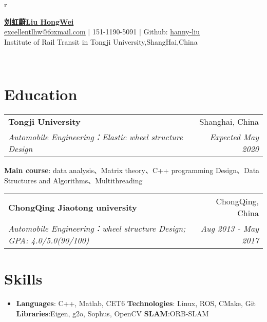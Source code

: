 \documentclass[CJK]{article}
\makeatletter
\newcommand{\resumeItemNoBullet}[2]{
  \item[]\small{
    \hspace{-9pt}\textbf{#1}{: #2 \vspace{-6pt}}%
  }
}
\newcommand{\resumeSubheading}[4]{
  \vspace{0pt}\item[]%
  \begin{tabular*}{0.98\textwidth}{l@{\extracolsep{\fill}}r}
      \hspace{-10pt}\textbf{#1} & #2 \\
      \hspace{-10pt}\textit{\small#3} & \textit{\small #4} \\
    \end{tabular*}\vspace{-5pt}
}
\newcommand{\resumeSubHeadingListStart}{\begin{itemize}[leftmargin=*]}
\newcommand{\resumeSubHeadingListEnd}{\end{itemize}}
\newcommand{\shorterSection}[1]{\vspace{-10pt}\section{#1}}
\makeatother
\begin{document}
\begin{CJK}{UTF8}{gkai}

\begin{multicols}{2}
    \Large{
        \begin{tabu}{ r }
        \end{tabu}
    }
    
\end{multicols}


\begin{center}

  \small \textbf{\textbf{\href{aptsunny.github.io}{\Large 刘虹蔚Liu HongWei}}} \\  \href{excellentlhw@foxmail.com}{\color{blue}\underline{excellentlhw@foxmail.com}} $\vert$
  151-1190-5091 $\vert$
  Github: \href{https://github.com/hanny-liu}{\color{blue}\underline{hanny-liu}} \\
  \small Institute of Rail Transit in Tongji University,ShangHai,China\\
\end{center}


~\\

\shorterSection{Education}
  \resumeSubHeadingListStart
    \resumeSubheading
      {\large Tongji University}{Shanghai, China}
      {Automobile Engineering：Elastic wheel structure Design}{Expected May 2020}{
      \resumeItemNoBullet{Main course}{data analysis、Matrix theory、C++ programming Design、Data Structures and Algorithms、Multithreading}}
      \vspace{2pt}
    \resumeSubheading
      {\large ChongQing Jiaotong university}{ChongQing, China}
      {Automobile Engineering：wheel structure Design;  GPA: 4.0/5.0(90/100)}{Aug 2013 - May 2017}
  \resumeSubHeadingListEnd

\shorterSection{Skills}
  \resumeSubHeadingListStart
  \small
    \item{
     \textbf{Languages}{: C++, Matlab, CET6\quad}
     \textbf{Technologies}{: Linux, ROS, CMake, Git\quad}
     \textbf{Libraries}{:Eigen, g2o, Sophus, OpenCV\quad}
     \textbf{SLAM}{:ORB-SLAM}
    }
\resumeSubHeadingListEnd


\end{CJK}
\end{document}
